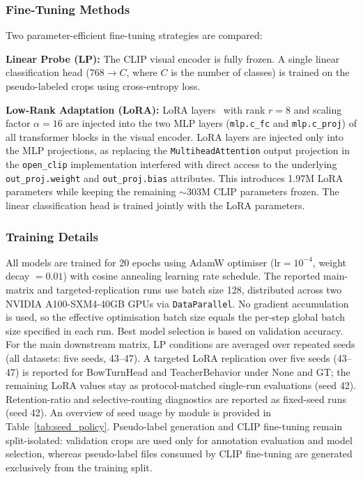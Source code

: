 \documentclass{ieeeaccess}
\begin{document}
\subsubsection{Fine-Tuning Methods}

Two parameter-efficient fine-tuning strategies are compared:

\textbf{Linear Probe (LP):} The CLIP visual encoder is fully frozen.
A single linear classification head ($768 \to C$, where $C$ is the
number of classes) is trained on the pseudo-labeled crops using
cross-entropy loss.

\textbf{Low-Rank Adaptation (LoRA):} LoRA layers~\cite{hu2022lora}
with rank $r=8$ and scaling factor $\alpha=16$ are injected into the
two MLP layers (\texttt{mlp.c\_fc} and \texttt{mlp.c\_proj}) of all
transformer blocks in the visual encoder.
LoRA layers are injected only into the MLP projections, as replacing
the \texttt{MultiheadAttention} output projection in the \texttt{open\_clip}
implementation interfered with direct access to the underlying
\texttt{out\_proj.weight} and \texttt{out\_proj.bias} attributes.
This introduces 1.97M LoRA parameters while keeping the remaining
$\sim$303M CLIP parameters frozen.
The linear classification head is trained jointly with the LoRA
parameters.

\subsubsection{Training Details}

All models are trained for 20 epochs using AdamW optimiser
($\text{lr}=10^{-4}$, weight decay $= 0.01$) with cosine annealing
learning rate schedule.
The reported main-matrix and targeted-replication runs use batch size
128, distributed across two NVIDIA
A100-SXM4-40GB GPUs via \texttt{DataParallel}.
No gradient accumulation is used, so the effective optimisation batch
size equals the per-step global batch size specified in each run.
Best model selection is based on validation accuracy.
For the main downstream matrix, LP conditions are averaged over
repeated seeds (all datasets: five seeds, 43--47). A targeted LoRA replication over five seeds
(43--47) is reported for BowTurnHead and TeacherBehavior under None
and GT; the remaining LoRA values stay as protocol-matched single-run
evaluations (seed 42).
Retention-ratio and selective-routing diagnostics are reported as
fixed-seed runs (seed 42).
An overview of seed usage by module is provided in
Table~\ref{tab:seed_policy}.
Pseudo-label generation and CLIP fine-tuning remain split-isolated:
validation crops are used only for annotation evaluation and model
selection, whereas pseudo-label files consumed by CLIP fine-tuning are
generated exclusively from the training split.
\end{document}

